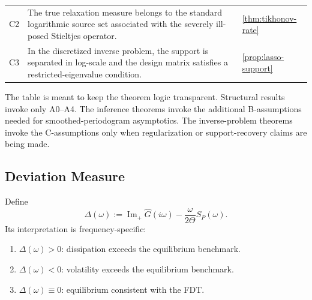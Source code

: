 \documentclass[11pt]{article}
\newcommand{\Ghat}{\widehat{G}}
\newcommand{\ImPart}{\operatorname{Im}_{\!+}}
\newcommand{\REV}{}
\begin{document}
\begin{table}[t]
\begin{tabular}{>{\raggedright\arraybackslash}p{} >{\raggedright\arraybackslash}p{} >{\raggedright\arraybackslash}p{}}
C2 & The true relaxation measure belongs to the standard logarithmic source set associated with the severely ill-posed Stieltjes operator. & \cref{thm:tikhonov-rate} \\
C3 & In the discretized inverse problem, the support is separated in log-scale and the design matrix satisfies a restricted-eigenvalue condition. & \cref{prop:lasso-support} \\
\bottomrule
\end{tabular}
\label{tab:assumptions}
\end{table}

\REV
The table is meant to keep the theorem logic transparent. Structural results invoke only A0--A4. The inference theorems invoke the additional B-assumptions needed for smoothed-periodogram asymptotics. The inverse-problem theorems invoke the C-assumptions only when regularization or support-recovery claims are being made.

\subsection{Deviation Measure}
Define
\begin{equation}\label{eq:delta-def}
  \Delta(\omega):=\ImPart \Ghat(i\omega)-\frac{\omega}{2\Theta}S_P(\omega).
\end{equation}
Its interpretation is frequency-specific:
\begin{enumerate}[label=\arabic*.]
  \item $\Delta(\omega)>0$: dissipation exceeds the equilibrium benchmark.
  \item $\Delta(\omega)<0$: volatility exceeds the equilibrium benchmark.
  \item $\Delta(\omega)\equiv 0$: equilibrium consistent with the FDT.
\end{enumerate}
\end{document}
